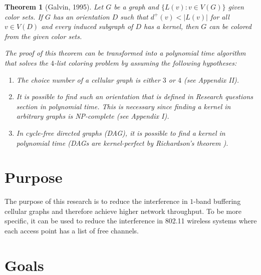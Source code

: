 \documentclass[letterpaper, 10 pt, conference]{ieeeconf}  %
\newtheorem{thm}{Theorem}
\begin{document}
\begin{thm}[Galvin, 1995]\label{thm:galvin} Let $G$ be a graph and $\lbrace L(v) : v \in V(G) \rbrace$ given color sets. If $G$ has an orientation $D$ such that $d^+(v) < |L(v)|$ for all $v \in V(D)$ and every induced subgraph of $D$ has a kernel, then $G$ can be colored from the given color sets.

The proof of this theorem can be transformed into a polynomial time algorithm that solves the $4$-list coloring problem by assuming the following hypotheses:

\begin{enumerate}
\item The choice number of a cellular graph is either $3$ or $4$ (see Appendix II).
\item It is possible to find such an orientation that is defined in Research questions section in polynomial time. This is necessary since finding a kernel in arbitrary graphs is NP-complete \cite{chvatal} (see Appendix I).
\item In cycle-free directed graphs (DAG), it is possible to find a kernel in polynomial time (DAGs are kernel-perfect by Richardson's theorem \cite{richardson1946}).
\end{enumerate}
\end{thm}

\section{Purpose}

The purpose of this research is to reduce the interference in $1$-band buffering cellular graphs and therefore achieve higher network throughput. To be more specific, it can be used to reduce the interference in 802.11 wireless systems where each access point has a list of free channels.

\section{Goals}

\end{document}
